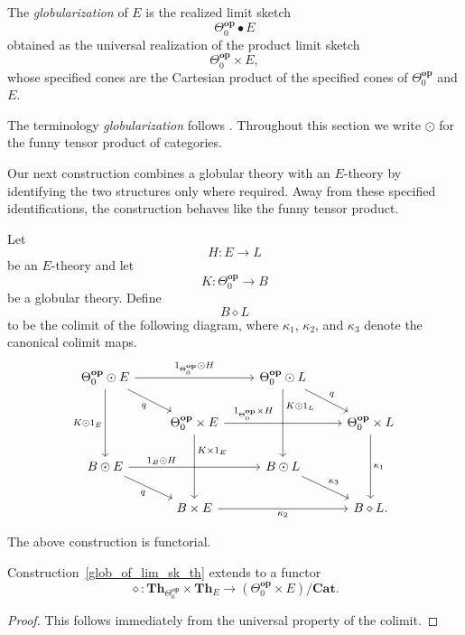 \documentclass{tac}
\begin{document}
\begin{definition}\label{glob_of_lim_sk}
The \emph{globularization} of $E$ is the realized limit sketch
\[
\Theta_0^\mathbf{op}\bullet E
\]
obtained as the universal realization of the product limit sketch
\[
\Theta_0^\mathbf{op}\times E,
\]
whose specified cones are the Cartesian product of the specified cones of
$\Theta_0^\mathbf{op}$ and $E$.
\end{definition}

The terminology \emph{globularization} follows \cite{Bressie2020}. Throughout this section we write
$\odot$ for the funny tensor product of categories.

Our next construction combines a globular theory with an $E$-theory by identifying the two structures only where required. Away from these specified identifications, the construction behaves like the funny tensor product.

\begin{construction}\label{glob_of_lim_sk_th}
Let
\[
H:E\to L
\]
be an $E$-theory and let
\[
K:\Theta_0^\mathbf{op}\to B
\]
be a globular theory. Define
\[
B\diamond L
\]
to be the colimit of the following diagram, where $\kappa_1$, $\kappa_2$, and $\kappa_3$ denote the canonical colimit maps.
\[
\begin{tikzcd}
\Theta_0^\mathbf{op}\odot E
\ar[dd,swap,"K\odot1_E"]
\ar[dr,swap,"q"]
\ar[rr,"1_{\Theta_0^\mathbf{op}}\odot H"]
&&
\Theta_0^\mathbf{op}\odot L
\ar[rd,"q"]
\ar[dd,"K\odot1_L" near start]
&
\\
&
\Theta_0^\mathbf{op}\times E
\ar[rr,"1_{\Theta_0^\mathbf{op}}\times H" near start]
\ar[dd,"K\times1_E" near start]
&&
\Theta_0^\mathbf{op}\times L
\ar[dd,"\kappa_1"]
\\
B\odot E
\ar[rr,"1_B\odot H" near start]
\ar[dr,swap,"q"]
&&
B\odot L
\ar[dr,"\kappa_3"]
&
\\
&
B\times E
\ar[rr,swap,"\kappa_2"]
&&
B\diamond L.
\end{tikzcd}
\]
\end{construction}

The above construction is functorial.

\begin{lemma}
Construction~\ref{glob_of_lim_sk_th} extends to a functor
\[
\diamond:
\mathbf{Th}_{\Theta_0^\mathbf{op}}
\times
\mathbf{Th}_E
\longrightarrow
(\Theta_0^\mathbf{op}\times E)/\mathbf{Cat}.
\]
\end{lemma}

\begin{proof}
This follows immediately from the universal property of the colimit.
\end{proof}
\end{document}
